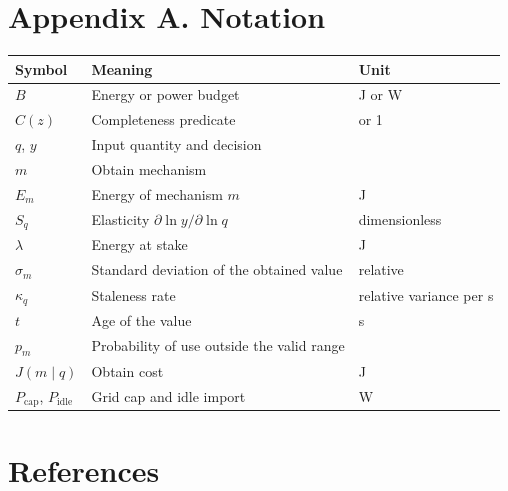 \documentclass[10pt,letterpaper]{article}
\newcounter{none}
\begin{document}
\section{Appendix A. Notation}\label{appendix-a.-notation}

{\def\LTcaptype{none} %
{\footnotesize\setlength{\tabcolsep}{3.8pt}\renewcommand{\arraystretch}{1.15}
\begin{longtable}[]{@{}
  >{\raggedright\arraybackslash}p{}
  >{\raggedright\arraybackslash}p{}
  >{\raggedright\arraybackslash}p{}@{}}
\toprule\noalign{}
\begin{minipage}[b]{\linewidth}\raggedright
\textbf{Symbol}
\end{minipage} & \begin{minipage}[b]{\linewidth}\raggedright
\textbf{Meaning}
\end{minipage} & \begin{minipage}[b]{\linewidth}\raggedright
\textbf{Unit}
\end{minipage} \\
\midrule\noalign{}
\endhead
\bottomrule\noalign{}
\endlastfoot
\(B\) & Energy or power budget & J or W \\
\(C(z)\) & Completeness predicate & 0 or 1 \\
\(q\), \(y\) & Input quantity and decision & \\
\(m\) & Obtain mechanism & \\
\(E_m\) & Energy of mechanism \(m\) & J \\
\(S_q\) & Elasticity \(\partial \ln y / \partial \ln q\) &
dimensionless \\
\(\lambda\) & Energy at stake & J \\
\(\sigma_m\) & Standard deviation of the obtained value & relative \\
\(\kappa_q\) & Staleness rate & relative variance per s \\
\(t\) & Age of the value & s \\
\(p_m\) & Probability of use outside the valid range & \\
\(J(m \mid q)\) & Obtain cost & J \\
\(P_{\text{cap}}\), \(P_{\text{idle}}\) & Grid cap and idle import &
W \\
\end{longtable}
}
}

\section{References}\label{references}
\end{document}
